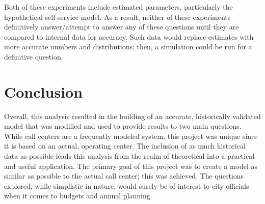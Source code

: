 \documentclass[12pt]{article}
\begin{document}
\par

Both of these experiments include estimated parameters, particularly the hypothetical self-service model.  As a result, neither of these experiments definitively answer/attempt to answer any of these questions until they are compared to internal data for accuracy.  Such data would replace estimates with more accurate numbers and distributions; then, a simulation could be run for a definitive question.









\section{Conclusion}

Overall, this analysis resulted in the building of an accurate, historically validated model that was modified and used to provide results to two main questions.  While call centers are a frequently modeled system, this project was unique since it is based on an actual, operating center.  The inclusion of as much historical data as possible leads this analysis from the realm of theoretical into a practical and useful application.  The primary goal of this project was to create a model as similar as possible to the actual call center; this was achieved.  The questions explored, while simplistic in nature, would surely be of interest to city officials when it comes to budgets and annual planning.
\end{document}
